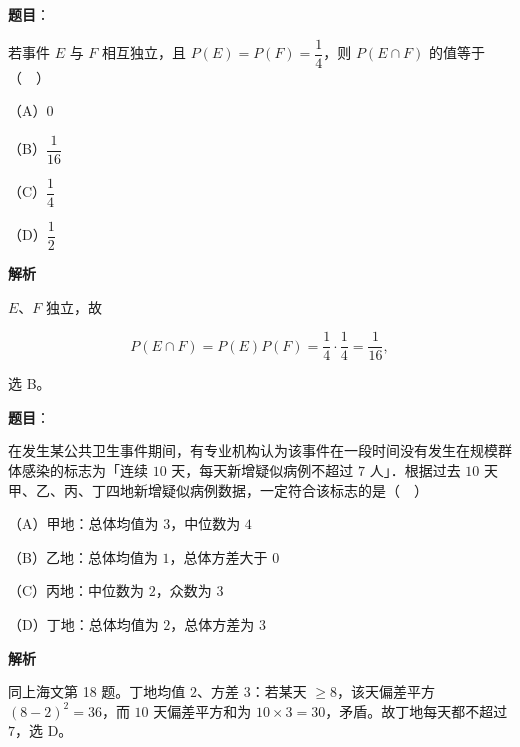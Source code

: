 \begin{answer}

\textbf{题目}：

若事件 $E$ 与 $F$ 相互独立，且 $P(E)=P(F)=\dfrac14$，则 $P(E\cap F)$ 的值等于（　）

（A）$0$

（B）$\dfrac1{16}$

（C）$\dfrac14$

（D）$\dfrac12$

\textbf{解析}

$E$、$F$ 独立，故

\nopagebreak[4]
\[P(E\cap F)=P(E)P(F)=\frac14\cdot\frac14=\frac1{16},\]

选 B。


\end{answer}
\begin{answer}

\textbf{题目}：

在发生某公共卫生事件期间，有专业机构认为该事件在一段时间没有发生在规模群体感染的标志为「连续 $10$ 天，每天新增疑似病例不超过 $7$ 人」．根据过去 $10$ 天甲、乙、丙、丁四地新增疑似病例数据，一定符合该标志的是（　）

（A）甲地：总体均值为 $3$，中位数为 $4$

（B）乙地：总体均值为 $1$，总体方差大于 $0$

（C）丙地：中位数为 $2$，众数为 $3$

（D）丁地：总体均值为 $2$，总体方差为 $3$

\textbf{解析}

同上海文第 18 题。丁地均值 $2$、方差 $3$：若某天 $\geqslant8$，该天偏差平方 $(8-2)^2=36$，而 $10$ 天偏差平方和为 $10\times3=30$，矛盾。故丁地每天都不超过 $7$，选 D。


\end{answer}
